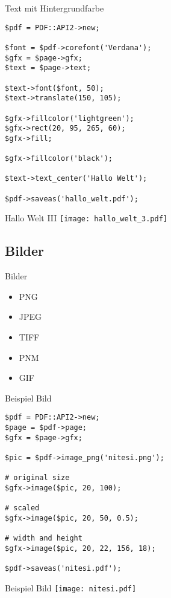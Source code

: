 \begin{frame}[fragile]{Text mit Hintergrundfarbe}
\begin{lstlisting}
$pdf = PDF::API2->new;

$font = $pdf->corefont('Verdana');
$gfx = $page->gfx;
$text = $page->text;

$text->font($font, 50);
$text->translate(150, 105);

$gfx->fillcolor('lightgreen');
$gfx->rect(20, 95, 265, 60);
$gfx->fill;

$gfx->fillcolor('black');

$text->text_center('Hallo Welt');

$pdf->saveas('hallo_welt.pdf');
\end{lstlisting}
\end{frame}

\begin{frame}{Hallo Welt III}
\texttt{[image: hallo\_welt\_3.pdf]}
\end{frame}

\subsection{Bilder}
\begin{frame}{Bilder}
\begin{itemize}
\item PNG
\item JPEG
\item TIFF
\item PNM
\item GIF
\end{itemize}
\end{frame}

\begin{frame}[fragile]{Beispiel Bild}
\begin{lstlisting}
$pdf = PDF::API2->new;
$page = $pdf->page;
$gfx = $page->gfx;

$pic = $pdf->image_png('nitesi.png');

# original size
$gfx->image($pic, 20, 100);

# scaled
$gfx->image($pic, 20, 50, 0.5);

# width and height
$gfx->image($pic, 20, 22, 156, 18);

$pdf->saveas('nitesi.pdf');
\end{lstlisting}
\end{frame}

\begin{frame}{Beispiel Bild}
\texttt{[image: nitesi.pdf]}
\end{frame}

